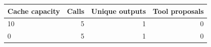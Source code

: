 \begin{tabular}{lrrr}
\toprule
Cache capacity & Calls & Unique outputs & Tool proposals \\
\midrule
10 & 5 & 1 & 0 \\
0 & 5 & 1 & 0 \\
\bottomrule
\end{tabular}
